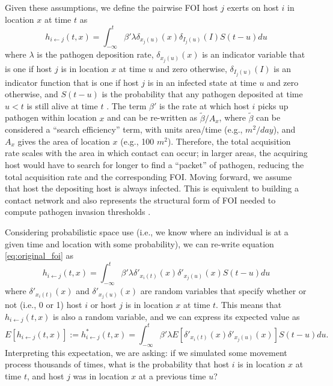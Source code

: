 \documentclass[letterpaper]{article}
\begin{document}
Given these assumptions, we define the pairwise FOI host $j$ exerts on host $i$ in location $x$ at time $t$ as \citep{Wilber2022}
\begin{equation}
    h_{i \leftarrow j}(t, x) = \int_{-\infty}^{t} \beta' \lambda \delta_{x_j(u)}(x) \delta_{I_j(u)}(I) S(t - u) du
    \label{eq:original_foi}
\end{equation}
where $\lambda$ is the pathogen deposition rate, $\delta_{x_j(u)}(x)$ is an indicator variable that is one if host $j$ is in location $x$ at time $u$ and zero otherwise, $\delta_{I_j(u)}(I)$ is an indicator function that is one if host $j$ is in an infected state at time $u$ and zero otherwise, and $S(t-u)$ is the probability that any pathogen deposited at time $u < t$ is still alive at time $t$ \citep[see][for a full derivation]{Wilber2022}. 
The term $\beta'$ is the rate at which host $i$ picks up pathogen within location $x$ and can be re-written as $\tilde{\beta} / A_x$, where $\tilde{\beta}$ can be considered a ``search efficiency'' term, with units area/time (e.g., $m^2 / day$), and $A_x$ gives the area of location $x$ (e.g., 100 $m^2$). 
Therefore, the total acquisition rate scales with the area in which contact can occur; in larger areas, the acquiring host would have to search for longer to find a ``packet'' of pathogen, reducing the total acquisition rate and the corresponding FOI. Moving forward, we assume that host the depositing host is always infected. This is equivalent to building a contact network and also represents the structural form of FOI needed to compute pathogen invasion thresholds \citep{Wilber2022}.

Considering probabilistic space use (i.e., we know where an individual is at a given time and location with some probability), we can re-write equation \ref{eq:original_foi} as
\begin{equation}
    h_{i \leftarrow j}(t, x) = \int_{-\infty}^{t} \beta' \lambda \delta'_{x_i(t)}(x) \delta'_{x_j(u)}(x) S(t - u) du
    \label{eq:prob_foi}
\end{equation}
where $\delta'_{x_i(t)}(x)$ and $\delta'_{x_j(u)}(x)$ are random variables that specify whether or not (i.e., 0 or 1) host $i$ or host $j$ is in location $x$ at time $t$.  This means that $h_{i \leftarrow j}(t, x)$ is also a random variable, and we can express its expected value as 
\begin{equation}
    E[h_{i \leftarrow j}(t, x)] := h^*_{i \leftarrow j}(t, x) = \int_{-\infty}^{t} \beta' \lambda E[\delta'_{x_i(t)}(x) \delta'_{x_j(u)}(x)] S(t - u) du.
    \label{eq:expected_foi}
\end{equation}
Interpreting this expectation, we are asking: if we simulated some movement process thousands of times, what is the probability that host $i$ is in location $x$ at time $t$, and host $j$ was in location $x$ at a previous time $u$? 
\end{document}
